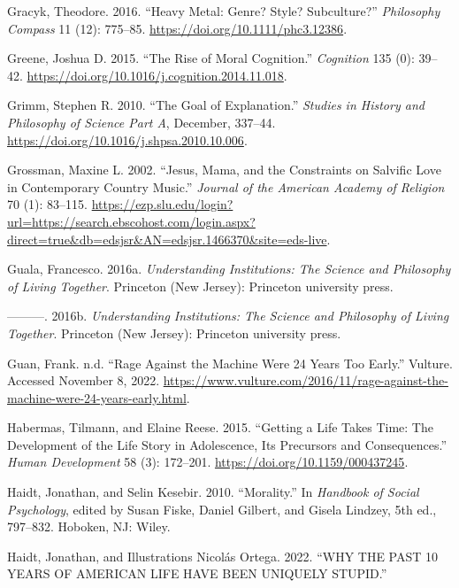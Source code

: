 \documentclass[12pt]{book}
\newenvironment{CSLReferences}%
  {\setlength{\parindent}{0pt}%
   \setlength{\leftskip}{0pt}%
   \setlength{\parskip}{0pt}}%
  {\par}
\theoremstyle{definition}
\theoremstyle{remark}
\begin{document}
\begin{CSLReferences}{1}{0}
Gracyk, Theodore. 2016. {``Heavy Metal: Genre? {Style}? {Subculture}?''} \emph{Philosophy Compass} 11 (12): 775--85. \url{https://doi.org/10.1111/phc3.12386}.

Greene, Joshua D. 2015. {``The Rise of Moral Cognition.''} \emph{Cognition} 135 (0): 39--42. \url{https://doi.org/10.1016/j.cognition.2014.11.018}.

Grimm, Stephen R. 2010. {``The Goal of Explanation.''} \emph{Studies in History and Philosophy of Science Part A}, December, 337--44. \url{https://doi.org/10.1016/j.shpsa.2010.10.006}.

Grossman, Maxine L. 2002. {``Jesus, {Mama}, and the {Constraints} on {Salvific Love} in {Contemporary Country Music}.''} \emph{Journal of the American Academy of Religion} 70 (1): 83--115. \url{https://ezp.slu.edu/login?url=https://search.ebscohost.com/login.aspx?direct=true&db=edsjsr&AN=edsjsr.1466370&site=eds-live}.

Guala, Francesco. 2016a. \emph{Understanding Institutions: The Science and Philosophy of Living Together}. Princeton (New Jersey): Princeton university press.

---------. 2016b. \emph{Understanding {Institutions}: {The Science} and {Philosophy} of {Living Together}}. Princeton (New Jersey): Princeton university press.

Guan, Frank. n.d. {``Rage Against the Machine Were 24 Years Too Early.''} Vulture. Accessed November 8, 2022. \url{https://www.vulture.com/2016/11/rage-against-the-machine-were-24-years-early.html}.

Habermas, Tilmann, and Elaine Reese. 2015. {``Getting a Life Takes Time: The Development of the Life Story in Adolescence, Its Precursors and Consequences.''} \emph{Human Development} 58 (3): 172--201. \url{https://doi.org/10.1159/000437245}.

Haidt, Jonathan, and Selin Kesebir. 2010. {``Morality.''} In \emph{Handbook of Social Psychology}, edited by Susan Fiske, Daniel Gilbert, and Gisela Lindzey, 5th ed., 797--832. Hoboken, NJ: Wiley.

Haidt, Jonathan, and Illustrations Nicolás Ortega. 2022. {``{WHY THE PAST} 10 {YEARS OF AMERICAN LIFE HAVE BEEN UNIQUELY STUPID}.''}


\end{CSLReferences}
\end{document}
